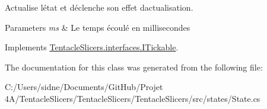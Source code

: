 Actualise l\textquotesingle{}état et déclenche son effet d\textquotesingle{}actualisation. 


\begin{DoxyParams}{Parameters}
{\em ms} & Le temps écoulé en millisecondes \\
\hline
\end{DoxyParams}


Implements \hyperlink{interface_tentacle_slicers_1_1interfaces_1_1_i_tickable}{Tentacle\+Slicers.\+interfaces.\+I\+Tickable}.



The documentation for this class was generated from the following file\+:\begin{DoxyCompactItemize}
\item 
C\+:/\+Users/sidne/\+Documents/\+Git\+Hub/\+Projet 4\+A/\+Tentacle\+Slicers/\+Tentacle\+Slicers/\+Tentacle\+Slicers/src/states/State.\+cs\end{DoxyCompactItemize}
